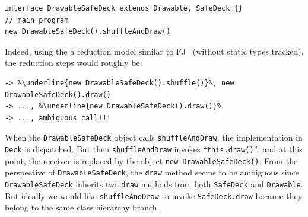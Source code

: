 \vspace{3pt}\begin{lstlisting}
interface DrawableSafeDeck extends Drawable, SafeDeck {}
// main program
new DrawableSafeDeck().shuffleAndDraw()
\end{lstlisting}\vspace{3pt}

\noindent Indeed, using the a reduction model similar to FJ~\cite{Igarashi01FJ} (without static types tracked), the reduction steps would roughly be:


\vspace{3pt}\begin{lstlisting}[style=reduction, escapechar=\%]
   %\underline{new DrawableSafeDeck()}%.shuffleAndDraw()
-> %\underline{new DrawableSafeDeck().shuffle()}%, new DrawableSafeDeck().draw()
-> ..., %\underline{new DrawableSafeDeck().draw()}%
-> ..., ambiguous call!!!
\end{lstlisting}\vspace{3pt}

\noindent When the \lstinline|DrawableSafeDeck| object calls \lstinline|shuffleAndDraw|, the implementation in \lstinline|Deck|
is dispatched. But then \lstinline|shuffleAndDraw| invokes ``\lstinline|this.draw()|'', and at this point, the receiver
is replaced by the object \lstinline|new DrawableSafeDeck()|.
From the perspective of \lstinline|DrawableSafeDeck|, the
\lstinline|draw| method seems to be ambiguous since
\lstinline|DrawableSafeDeck| inherits two \lstinline|draw| methods from
both \lstinline|SafeDeck| and \lstinline|Drawable|. 
But ideally we would
like \lstinline|shuffleAndDraw| to invoke \lstinline|SafeDeck.draw|
because they belong to the same class hierarchy branch.

